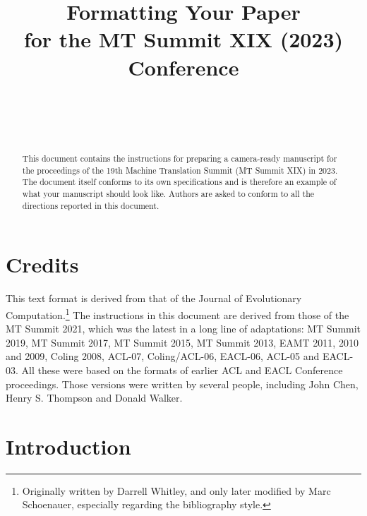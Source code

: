 \documentclass[]{article}
\begin{document}
\title{\bf Formatting Your Paper \\
  for the MT Summit XIX (2023) Conference}

\author{ \hfill  {}\\
         \hfill {}\\
\AND
        \hfill {}\\
}

\maketitle
\pagestyle{empty}

\begin{abstract}
This document contains the instructions for preparing a camera-ready manuscript for the proceedings of the 19th Machine Translation Summit (MT Summit XIX) in 2023. The document itself conforms to its own specifications and is therefore an example of what your manuscript should look like. Authors are asked to conform to all the directions reported in this document.
\end{abstract}

\section{Credits}

This text format is derived from that of the Journal of Evolutionary
Computation.\footnote{Originally written by Darrell Whitley, and only
  later modified by Marc Schoenauer, especially regarding the
  bibliography style.}
The instructions in this document are derived from those of the MT Summit 2021,
which was the latest in a long line of adaptations: MT Summit 2019, MT Summit 2017,
MT Summit 2015, MT Summit 2013, EAMT 2011, 2010 and 2009, Coling 2008, ACL-07,
Coling/ACL-06, EACL-06, ACL-05 and EACL-03. All these were based on the formats
of earlier ACL and EACL Conference proceedings. Those versions were written by
several people, including John Chen, Henry S. Thompson and Donald Walker.

\section{Introduction}
\end{document}
